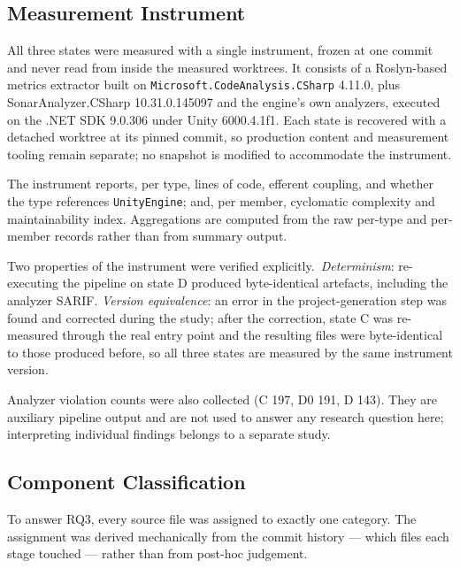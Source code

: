 \documentclass{sbc2019}%
\begin{document}
\subsection{Measurement Instrument}

All three states were measured with a single instrument, frozen at one commit
and never read from inside the measured worktrees. It consists of a Roslyn-based
metrics extractor built on \texttt{Microsoft.CodeAnalysis.CSharp} 4.11.0, plus
SonarAnalyzer.CSharp 10.31.0.145097 and the engine's own analyzers, executed on
the \mbox{.NET} SDK 9.0.306 under Unity 6000.4.1f1. Each state is recovered with a detached
worktree at its pinned commit, so production content and measurement tooling
remain separate; no snapshot is modified to accommodate the instrument.

The instrument reports, per type, lines of code, efferent coupling, and whether
the type references \texttt{UnityEngine}; and, per member, cyclomatic complexity
and maintainability index. Aggregations are computed from the raw per-type and
per-member records rather than from summary output.

Two properties of the instrument were verified explicitly.\ \emph{Determinism}:
re-executing the pipeline on state D produced byte-identical artefacts,
including the analyzer SARIF\@. \emph{Version equivalence}: an error in the
project-generation step was found and corrected during the study; after the
correction, state C was re-measured through the real entry point and the
resulting files were byte-identical to those produced before, so all three
states are measured by the same instrument version.

Analyzer violation counts were also collected (C 197, D0 191, D 143). They are
auxiliary pipeline output and are not used to answer any research question here;
interpreting individual findings belongs to a separate study.

\subsection{Component Classification}

To answer RQ3, every source file was assigned to exactly one category. The
assignment was derived mechanically from the commit history --- which files each
stage touched --- rather than from post-hoc judgement.
\end{document}
